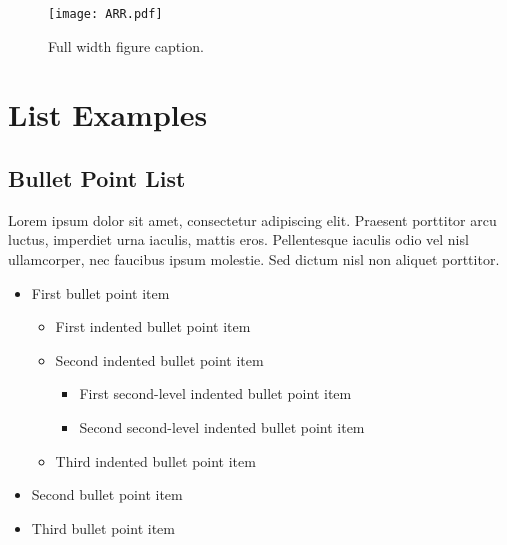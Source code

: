 \documentclass[
	a4paper, %
	11pt, %
]{DC_Report}
\begin{document}

\begin{figure} %
	\texttt{[image: ARR.pdf]}
	\caption{Full width figure caption.}
\end{figure}


\section{List Examples}

\subsection{Bullet Point List}

Lorem ipsum dolor sit amet, consectetur adipiscing elit. Praesent porttitor arcu luctus, imperdiet urna iaculis, mattis eros. Pellentesque iaculis odio vel nisl ullamcorper, nec faucibus ipsum molestie. Sed dictum nisl non aliquet porttitor.

\begin{itemize}
	\item First bullet point item
	\begin{itemize}
		\item First indented bullet point item
		\item Second indented bullet point item
		\begin{itemize}
			\item First second-level indented bullet point item
			\item Second second-level indented bullet point item
		\end{itemize}
		\item Third indented bullet point item
	\end{itemize}
	\item Second bullet point item
	\item Third bullet point item
\end{itemize}
\end{document}
